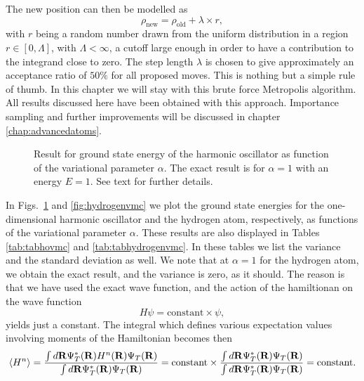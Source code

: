 The new position can then be modelled as
\[ \rho_{\mathrm{new}}=\rho_{\mathrm{old}}+\lambda\times r,\]
with $r$ being a random number drawn from the uniform distribution in a region $r\in [0,\Lambda]$, with $\Lambda< \infty$, 
a cutoff  large enough in order to have a contribution to the integrand close to zero.
The step length $\lambda$ is chosen to give approximately an acceptance ratio of $50\%$ for all proposed moves.
This is nothing but a simple rule of thumb. In this chapter we will stay with this brute force Metropolis algorithm.
All results discussed here have been obtained with this approach.  Importance sampling and further improvements will be discussed in chapter \ref{chap:advancedatoms}. 
\begin{figure}
\begin{center}

\caption{Result  for ground state energy of the harmonic oscillator as
         function of the variational parameter $\alpha$. The exact result
         is for $\alpha=1$ with an energy $E=1$. 
         See text for further details.\label{fig:hovmc}}
\end{center}
\end{figure}
In Figs.~\ref{fig:hovmc} and \ref{fig:hydrogenvmc} we plot the ground state
energies  for
the one-dimensional harmonic oscillator and the hydrogen atom, respectively,
as functions of the variational parameter $\alpha$. 
These results are also displayed in Tables \ref{tab:tabhovmc} and
\ref{tab:tabhydrogenvmc}. In these tables we list the variance and
the standard deviation as well. We note that at $\alpha=1$ for the hydrogen atom, we obtain the exact
result, and the variance is zero, as it should. The reason is that 
we have used the exact wave function, and the action of the hamiltionan
on the wave function
\[
   H\psi = \mathrm{constant}\times \psi,
\]
yields just a constant. The integral which defines various 
expectation values involving moments of the Hamiltonian becomes then
\[
   \langle H^n \rangle =
   \frac{\int d{\bf R}\Psi^{\ast}_T({\bf R})H^n({\bf R})\Psi_T({\bf R})}
        {\int d{\bf R}\Psi^{\ast}_T({\bf R})\Psi_T({\bf R})}=
\mathrm{constant}\times\frac{\int d{\bf R}\Psi^{\ast}_T({\bf R})\Psi_T({\bf R})}
        {\int d{\bf R}\Psi^{\ast}_T({\bf R})\Psi_T({\bf R})}=
\mathrm{constant}.
\]

